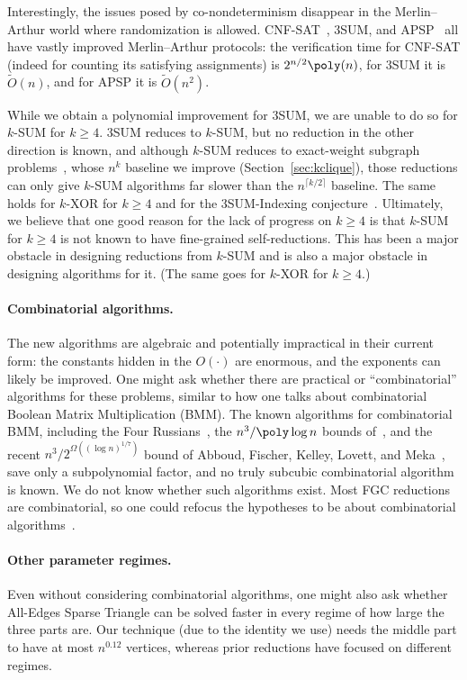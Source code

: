Interestingly, the issues posed by co-nondeterminism disappear in the Merlin--Arthur world where randomization is allowed. CNF-SAT~\cite{Wil16}, $3$SUM, and APSP~\cite{ACJRW22} all have vastly improved Merlin--Arthur protocols: the verification time for CNF-SAT (indeed for counting its satisfying assignments) is $2^{n/2}\poly(n)$, for $3$SUM it is $\tilde O(n)$, and for APSP it is $\tilde O(n^2)$.

While we obtain a polynomial improvement for $3$SUM, we are unable to do so for $k$-SUM for $k\geq 4$. $3$SUM reduces to $k$-SUM, but no reduction in the other direction is known, and although $k$-SUM reduces to exact-weight subgraph problems~\cite{AL13,ALW14}, whose $n^k$ baseline we improve (Section~\ref{sec:kclique}), those reductions can only give $k$-SUM algorithms far slower than the $n^{\lceil k/2\rceil}$ baseline. The same holds for $k$-XOR for $k\ge 4$ and for the 3SUM-Indexing conjecture~\cite{GKLP17b,KP19,GGHPV20}. Ultimately, we believe that one good reason for the lack of progress on $k\geq 4$ is that $k$-SUM for $k\geq 4$ is not known to have fine-grained self-reductions. This has been a major obstacle in designing reductions from $k$-SUM and is also a major obstacle in designing algorithms for it. (The same goes for $k$-XOR for $k\geq 4$.)


\paragraph{Combinatorial algorithms.}
The new algorithms are algebraic and potentially impractical in their current form: the constants hidden in the $O(\cdot)$ are enormous, and the exponents can likely be improved. One might ask whether there are practical or ``combinatorial'' algorithms for these problems, similar to how one talks about combinatorial Boolean Matrix Multiplication (BMM). The known algorithms for combinatorial BMM, including the Four Russians~\cite{ADKF70}, the $n^3/\poly\log n$ bounds of~\cite{BW09,Cha15,Yu18}, and the recent $n^3/2^{\Omega((\log n)^{1/7})}$ bound of Abboud, Fischer, Kelley, Lovett, and Meka~\cite{AFK+24}, save only a subpolynomial factor, and no truly subcubic combinatorial algorithm is known. We do not know whether such algorithms exist. Most FGC reductions are combinatorial, so one could refocus the hypotheses to be about combinatorial algorithms~\cite{VW10,VW18,AV14}. 

\paragraph{Other parameter regimes.}
Even without considering combinatorial algorithms, one might also ask whether All-Edges Sparse Triangle can be solved faster in every regime of how large the three parts are. Our technique (due to the identity we use) needs the middle part to have at most $n^{0.12}$ vertices, whereas prior reductions have focused on different regimes.

